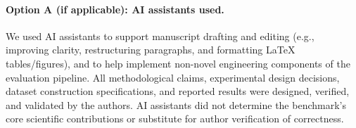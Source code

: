 \documentclass[11pt]{article}
\begin{document}
\paragraph{Option A (if applicable): AI assistants used.}
We used AI assistants to support manuscript drafting and editing (e.g., improving clarity, restructuring paragraphs, and formatting LaTeX tables/figures), and to help implement non-novel engineering components of the evaluation pipeline.
All methodological claims, experimental design decisions, dataset construction specifications, and reported results were designed, verified, and validated by the authors.
AI assistants did not determine the benchmark’s core scientific contributions or substitute for author verification of correctness.
\end{document}
